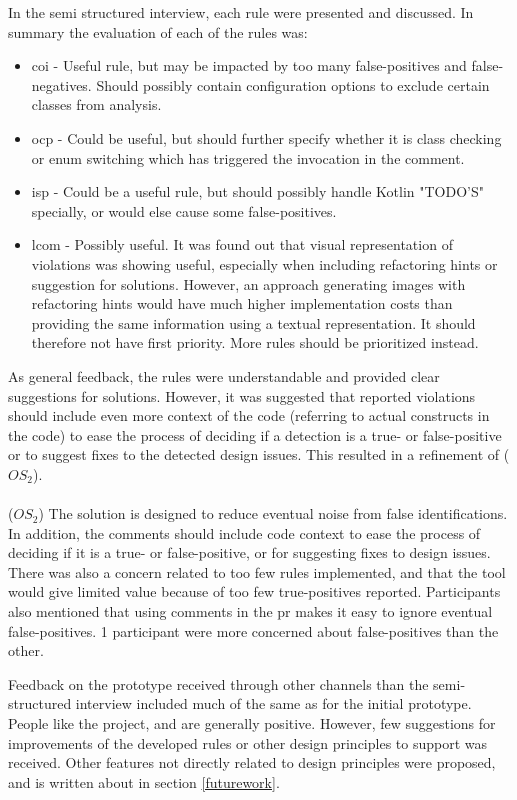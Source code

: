 \documentclass{report}
\begin{document}
In the semi structured interview, each rule were presented and discussed. In summary the evaluation of each of the rules was:
\begin{itemize}
    \item \gls{coi} - Useful rule, but may be impacted by too many false-positives and false-negatives. Should possibly contain configuration options to exclude certain classes from analysis.
\item \gls{ocp} - Could be useful, but should further specify whether it is class checking or enum switching which has triggered the invocation in the comment. 
\item \gls{isp} - Could be a useful rule, but should possibly handle Kotlin "TODO'S" specially, or would else cause some false-positives.
\item \gls{lcom} - Possibly useful. It was found out that visual representation of violations was showing useful, especially when including refactoring hints or suggestion for solutions. However, an approach generating images with refactoring hints would have much higher implementation costs than providing the same information using a textual representation. It should therefore not have first priority. More rules should be prioritized instead.
\end{itemize}

As general feedback, the rules were understandable and provided clear suggestions for solutions. However, it was suggested that reported violations should include even more context of the code (referring to actual constructs in the code) to ease the process of deciding if a detection is a true- or false-positive or to suggest fixes to the detected design issues. This resulted in a refinement of (\(OS_{2}\)). \\\\(\(OS_{2}\)) The solution is designed to reduce eventual noise from false identifications. In addition, the comments should include code context to ease the process of deciding if it is a true- or false-positive, or for suggesting fixes to design issues. \\

There was also a concern related to too few rules implemented, and that the tool would give limited value because of too few true-positives reported. Participants also mentioned that using comments in the \gls{pr} makes it easy to ignore eventual false-positives. 1 participant were more concerned about false-positives than the other.

Feedback on the prototype received through other channels than the semi-structured interview included much of the same as for the initial prototype. People like the project, and are generally positive. However, few suggestions for improvements of the developed rules or other design principles to support was received. Other features not directly related to design principles were proposed, and is written about in section \ref{futurework}.
\end{document}
